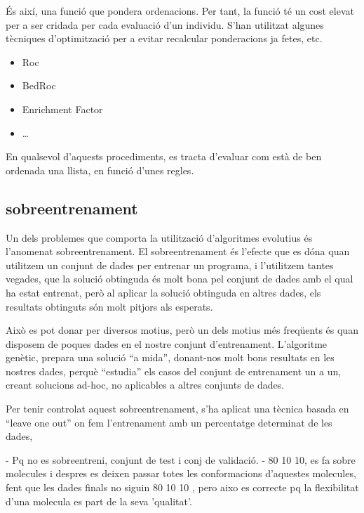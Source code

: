 \documentclass[titlepage,a4paper,12pt]{book}
\begin{document}


És així, una funció que pondera ordenacions.  Per tant, la funció té un cost
elevat per a ser cridada per cada evaluació d'un individu.  S'han utilitzat
algunes tècniques d'optimització per a evitar recalcular ponderacions ja fetes,
etc.


\begin{itemize}
	\item Roc
	\item BedRoc
	\item Enrichment Factor
	\item \dots
\end{itemize}


En qualsevol d'aquests procediments, es tracta d'evaluar com està de ben ordenada una llista, en
funció d'unes regles.



\subsection{sobreentrenament} %
\label{sub:sobreentrenament}

Un dels problemes que comporta la utilització d'algoritmes evolutius és
l'anomenat sobreentrenament.  El sobreentrenament és l'efecte que es dóna quan
utilitzem un conjunt de dades per entrenar un programa, i l'utilitzem tantes
vegades, que la solució obtinguda és molt bona pel conjunt de dades amb el qual
ha estat entrenat, però al aplicar la solució obtinguda en altres dades, els
resultats obtinguts són molt pitjors als esperats.

Això es pot donar per diversos motius, però un dels motius més freqüents és quan
disposem de poques dades en el nostre conjunt d'entrenament.  L'algoritme
genètic, prepara una solució ``a mida'', donant-nos molt bons resultats en les
nostres dades, perquè ``estudia'' els casos del conjunt de entrenament un a un,
creant solucions ad-hoc, no aplicables a altres conjunts de dades.

Per tenir controlat aquest sobreentrenament, s'ha aplicat una tècnica basada en
``leave one out'' on fem l'entrenament amb un percentatge determinat de les
dades, 

- Pq no es sobreentreni, conjunt de test i conj de validació.
- 80 10 10, es fa sobre molecules i despres es deixen passar totes les
conformacions d'aquestes molecules, fent que les dades finals no siguin 80 10 10
, pero aixo es correcte pq la flexibilitat d'una molecula es part de la seva
'qualitat'.


\end{document}

